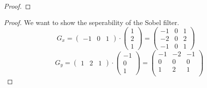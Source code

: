 \documentclass[journal]{IEEEtran}
\begin{document}
\begin{appendix}
\begin{proof}
	\end{proof}
	\begin{proof}
		We want to show the seperability of the Sobel filter.
		\[
			G_x  = \left( \begin{array}{ccc}
			-1 & 0 & 1
			\end{array}\right) \cdot  \left(\begin{array}{c}
			1 \\
			2 \\
			1
			\end{array}\right) = \left(\begin{array}{ccc}
				-1 & 0 & 1 \\
				-2 & 0 & 2 \\
				-1 & 0 & 1 
			\end{array}\right)
		\]
		\[
			\quad G_y = \left( \begin{array}{ccc}
			1 & 2 & 1
			\end{array}\right) \cdot  \left(\begin{array}{c}
			-1 \\
			0 \\
			1
			\end{array}\right)
			= \left(\begin{array}{ccc}
				-1 & -2 & -1 \\
				0 & 0 & 0 \\
				1 & 2 & 1 \\
			\end{array}\right)
		\]
	\end{proof}
\end{appendix}
\end{document}
